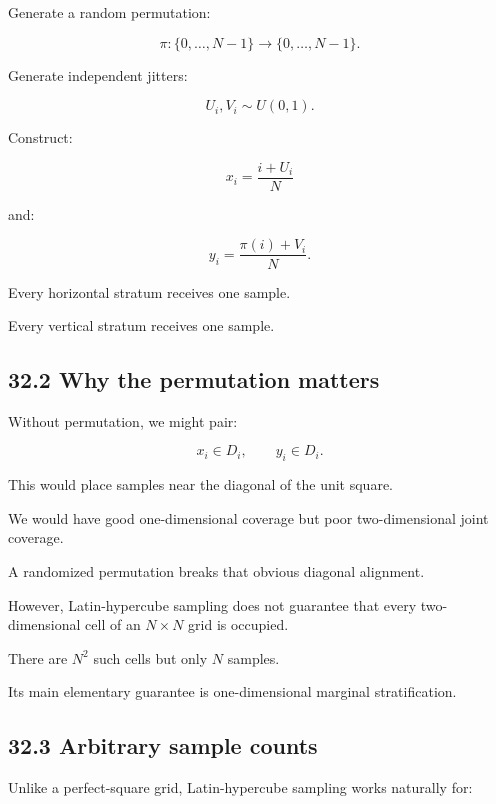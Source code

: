 \hypertarget{02-foundations-ii-ch031-two-dimensional-construction}{}

Generate a random permutation:

\[ \pi:\{0,\ldots,N-1\}\rightarrow\{0,\ldots,N-1\}. \]

Generate independent jitters:

\[ U_i,V_i\sim U(0,1). \]

Construct:

\[ \boxed{ x_i=\frac{i+U_i}{N} } \]

and:

\[ \boxed{ y_i=\frac{\pi(i)+V_i}{N} }. \]

Every horizontal stratum receives one sample.

Every vertical stratum receives one sample.

\subsection{32.2 Why the permutation matters}\label{02-foundations-ii-ch031-why-the-permutation-matters}

\hypertarget{02-foundations-ii-ch031-why-the-permutation-matters}{}

Without permutation, we might pair:

\[ x_i\in D_i,\qquad y_i\in D_i. \]

This would place samples near the diagonal of the unit square.

We would have good one-dimensional coverage but poor two-dimensional joint coverage.

A randomized permutation breaks that obvious diagonal alignment.

However, Latin-hypercube sampling does not guarantee that every two-dimensional cell of an \(N\times N\) grid is occupied.

There are \(N^2\) such cells but only \(N\) samples.

Its main elementary guarantee is one-dimensional marginal stratification.

\subsection{32.3 Arbitrary sample counts}\label{02-foundations-ii-ch031-arbitrary-sample-counts}

\hypertarget{02-foundations-ii-ch031-arbitrary-sample-counts}{}

Unlike a perfect-square grid, Latin-hypercube sampling works naturally for:

